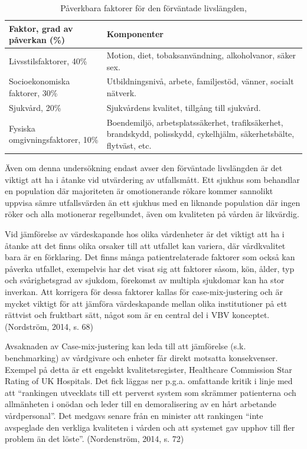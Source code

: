 \begin{table}[h]
\centering
\caption{Påverkbara faktorer för den förväntade livslängden,}
\label{livslangd}
\begin{tabular}{|p{6cm}|p{6cm}|}
\hline
Faktor, grad av påverkan (\%)    & Komponenter                                                                                                                        \\ \hline
Livsstilsfaktorer, 40\%          & Motion, diet, tobaksanvändning, alkoholvanor, säker sex.                                                                           \\ \hline
Socioekonomiska faktorer, 30\%   & Utbildningsnivå, arbete, familjestöd, vänner, socialt nätverk.                                                                     \\ \hline
Sjukvård, 20\%                   & Sjukvårdens kvalitet, tillgång till sjukvård. \\ \hline

Fysiska omgivningsfaktorer, 10\% & Boendemiljö, arbetsplatssäkerhet, trafiksäkerhet, brandskydd, polisskydd, cykelhjälm, säkerhetsbälte, flytväst, etc.               \\ \hline
\end{tabular}
\end{table}

Även om denna undersökning endast avser den förväntade livslängden är det viktigt att ha i åtanke vid utvärdering av utfallsmått. Ett sjukhus som behandlar en population där majoriteten är omotionerande rökare kommer sannolikt uppvisa sämre utfallsvärden än ett sjukhus med en liknande population där ingen röker och alla motionerar regelbundet, även om kvaliteten på vården är likvärdig.

Vid jämförelse av värdeskapande hos olika vårdenheter är det viktigt att ha i åtanke att det finns olika orsaker till att utfallet kan variera, där vårdkvalitet bara är en förklaring. Det finns många patientrelaterade faktorer som också kan påverka utfallet, exempelvis har det visat sig att faktorer såsom, kön, ålder, typ och svårighetsgrad av sjukdom, förekomst av multipla sjukdomar kan ha stor inverkan. Att korrigera för dessa faktorer kallas för case-mix-justering och är mycket viktigt för att jämföra värdeskapande mellan olika institutioner på ett rättvist och fruktbart sätt, något som är en central del i VBV konceptet. (Nordström, 2014, s. 68)

Avsaknaden av Case-mix-justering kan leda till att jämförelse (s.k. benchmarking) av vårdgivare och enheter får direkt motsatta konsekvenser. Exempel på detta är ett engelskt kvalitetsregister, Healthcare Commission Star Rating of UK Hospitals. Det fick läggas ner p.g.a. omfattande kritik i linje med att “rankingen utvecklats till ett perverst system som skrämmer patienterna och allmänheten i onödan och leder till en demoralisering av en hårt arbetande vårdpersonal”. Det medgavs senare från en minister att rankingen “inte avspeglade den verkliga kvaliteten i vården och att systemet gav upphov till fler problem än det löste”. (Nordenström, 2014, s. 72)

